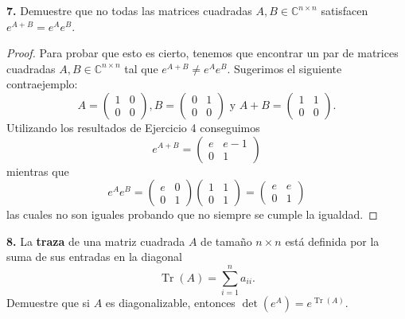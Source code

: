 \documentclass{article}
\newenvironment{statement}[1]{\smallskip\noindent\color[rgb]{1.00,0.00,0.50} {\bf #1.}}{}
\theoremstyle{definition}
\theoremstyle{remark}
\newcommand{\BC}{\mathbb C}
\DeclareMathOperator{\Tr}{Tr}
\begin{document}
\begin{statement}{7}
  Demuestre que no todas las matrices cuadradas $A, B \in \BC^{n \times n}$
  satisfacen $e^{A + B} = e^A e^B$.
\end{statement}

\begin{proof}
  Para probar que esto es cierto, tenemos que encontrar un par de matrices
  cuadradas $A, B \in \BC^{n \times n}$ tal que $e^{A + B} \neq e^A e^B$.
  Sugerimos el siguiente contraejemplo:
  \[
    A = \begin{pmatrix}
      1 & 0 \\
      0 & 0
    \end{pmatrix},
    B = \begin{pmatrix}
      0 & 1 \\
      0 & 0
    \end{pmatrix}
    \text{ y }
    A + B = \begin{pmatrix}
      1 & 1 \\
      0 & 0
    \end{pmatrix}.
  \]
  Utilizando los resultados de Ejercicio 4 conseguimos
  \[
    e^{A + B} = \begin{pmatrix}
      e & e - 1 \\
      0 & 1
    \end{pmatrix}  
  \]
  mientras que
  \[
    e^A e^B =
    \begin{pmatrix}
      e & 0 \\
      0 & 1
    \end{pmatrix}
    \begin{pmatrix}
      1 & 1 \\
      0 & 1
    \end{pmatrix}
    =
    \begin{pmatrix}
      e & e \\
      0 & 1
    \end{pmatrix}
  \]
  las cuales no son iguales probando que no siempre se cumple la igualdad.
\end{proof}

\begin{statement}{8}
  La \textbf{traza} de una matriz cuadrada $A$ de tama\~no $n \times n$ est\'a
  definida por la suma de sus entradas en la diagonal
  \[
    \Tr(A) = \sum_{i = 1} ^ n a_{i i}.  
  \]
  Demuestre que si $A$ es diagonalizable, entonces $\det(e^A) = e^{\Tr(A)}$.
\end{statement}
\end{document}
